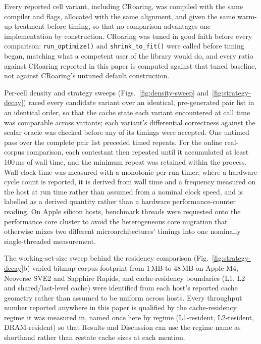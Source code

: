 Every reported cell variant, including CRoaring, was compiled with the same compiler and flags,
allocated with the same alignment, and given the same warm-up treatment before timing, so that no
comparison advantages one implementation by construction. CRoaring was tuned in good faith before every
comparison: \texttt{run\_optimize()} and \texttt{shrink\_to\_fit()} were called before timing began,
matching what a competent user of the library would do, and every ratio against CRoaring reported in
this paper is computed against that tuned baseline, not against CRoaring's untuned default
construction.

Per-cell density and strategy sweeps (Figs.~\ref{fig:density-sweep} and~\ref{fig:strategy-decay}) raced every candidate variant over an identical,
pre-generated pair list in an identical order, so that the cache state each variant encountered at
call time was comparable across variants; each variant's differential correctness against the scalar
oracle was checked before any of its timings were accepted. One untimed pass over the complete pair
list preceded timed repeats. For the online real-corpus comparison, each contestant then repeated
until it accumulated at least 100\,ms of wall time, and the minimum repeat was retained within the
process. Wall-clock time was measured with a monotonic
per-run timer; where a hardware cycle count is reported, it is derived from wall time and a
frequency measured on the host at run time rather than assumed from a nominal clock speed, and is
labelled as a derived quantity rather than a hardware performance-counter reading. On Apple silicon
hosts, benchmark threads were requested onto the performance core cluster to avoid the heterogeneous
core migration that otherwise mixes two different microarchitectures' timings into one nominally
single-threaded measurement.

The working-set-size sweep behind the residency comparison (Fig.~\ref{fig:strategy-decay}b) varied
bitmap-corpus footprint from 1\,MB to 48\,MB on Apple M4, Neoverse SVE2 and Sapphire Rapids,
and cache-residency boundaries (L1, L2 and shared/last-level cache) were identified from each host's
reported cache geometry rather than assumed to be uniform across hosts. Every throughput
number reported anywhere in this paper is qualified by the cache-residency regime it was measured in,
named once here by regime (L1-resident, L2-resident, DRAM-resident) so that Results and Discussion can
use the regime name as shorthand rather than restate cache sizes at each mention.

